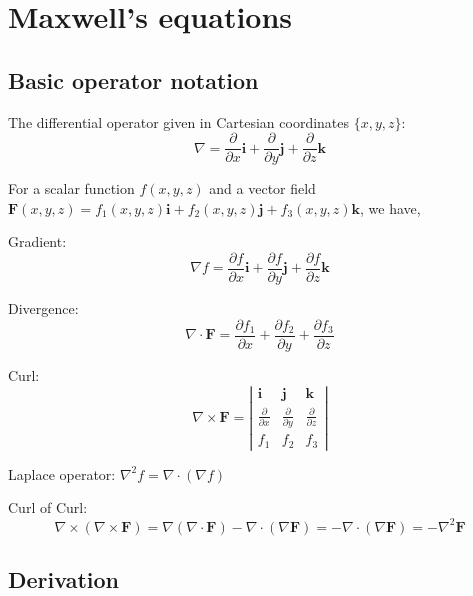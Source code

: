 \section{Maxwell's equations}

\subsection{Basic operator notation}

The differential operator given in Cartesian coordinates $\{x,y,z\}$: $$\nabla = \frac{\partial}{\partial x}\mathbf{i} + \frac{\partial}{\partial y}\mathbf{j} + \frac{\partial}{\partial z}\mathbf{k}$$

For a scalar function $f(x,y,z)$ and a vector field $\mathbf{F}(x,y,z) = f_1(x,y,z)\mathbf{i} + f_2(x,y,z)\mathbf{j} + f_3(x,y,z)\mathbf{k}$, we have,

Gradient: $$\nabla f = \frac{\partial f}{\partial x}\mathbf{i} + \frac{\partial f}{\partial y}\mathbf{j} + \frac{\partial f}{\partial z}\mathbf{k}$$

Divergence: $$\nabla\cdot\mathbf{F} = \frac{\partial f_1}{\partial x} + \frac{\partial f_2}{\partial y} + \frac{\partial f_3}{\partial z}$$

Curl: $$\nabla\times\mathbf{F} = \left|
\begin{array}{ccc}
	\mathbf{i} & \mathbf{j} & \mathbf{k} \\
	\frac{\partial}{\partial x} & \frac{\partial}{\partial y} & \frac{\partial}{\partial z} \\
	f_1 & f_2 & f_3
\end{array}
\right|$$

Laplace operator: $\nabla^2 f = \nabla\cdot(\nabla f)$

Curl of Curl: 
\begin{equation}
	\nabla\times(\nabla\times\mathbf{F}) = \nabla(\nabla\cdot\mathbf{F}) - \nabla\cdot(\nabla\mathbf{F}) = - \nabla\cdot(\nabla\mathbf{F}) = -\nabla^2\mathbf{F} \label{CurlOfCurl}
\end{equation}


\subsection{Derivation}

